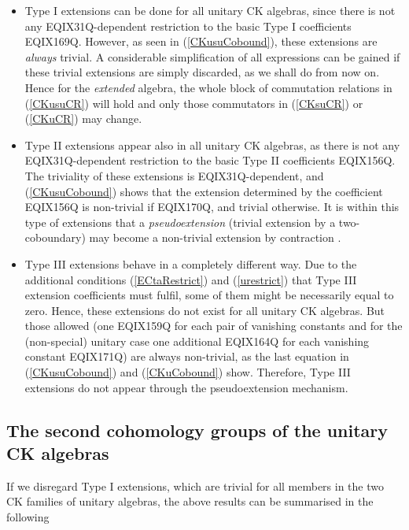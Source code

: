\begin{itemize}
\item
Type I extensions can be done for all  unitary CK
algebras, since there is not any EQIX31Q-dependent
restriction to the basic Type I coefficients
EQIX169Q. However, as seen in
(\ref{CKusuCobound}), these extensions are \emph{always} trivial. A
considerable simplification of all expressions can be gained
if these trivial extensions are simply discarded, as we shall
do from now on. Hence for the \emph{extended}
algebra, the whole block of commutation
relations in (\ref{CKusuCR}) will hold and only those commutators in
(\ref{CKsuCR}) or
(\ref{CKuCR}) may change.

\item
Type II extensions appear also in all  unitary CK
algebras, as there is not any EQIX31Q-dependent restriction to the
basic Type II coefficients
EQIX156Q. The triviality of these extensions is
EQIX31Q-dependent, and (\ref{CKusuCobound}) shows that the extension
determined by the  coefficient EQIX156Q is
non-trivial if EQIX170Q, and trivial otherwise. It is within
this type of extensions that a \emph{pseudoextension} (trivial
extension by a two-coboundary) may become a non-trivial extension
by contraction
\cite{Ald.Azc:85b,Azc.Izq:95}.

\item
Type III extensions behave in a completely different way.
Due to the additional conditions (\ref{ECtaRestrict}) and
(\ref{urestrict}) that Type III extension coefficients must fulfil, some
of them might be necessarily equal to zero. Hence, these extensions do not
exist for all  unitary CK algebras. But those allowed (one
EQIX159Q for each pair of vanishing constants  and for the (non-special)  unitary case one additional EQIX164Q
for each vanishing constant EQIX171Q) are
always non-trivial, as the last equation in (\ref{CKusuCobound}) and
(\ref{CKuCobound}) show. Therefore, Type III extensions  do
not appear through the pseudoextension mechanism.
\end{itemize}

\subsection{The second cohomology groups of the unitary CK algebras}
\label{sec4}

If we disregard Type I extensions, which are trivial for all members in
the two CK families of  unitary algebras, the above  results can be
summarised in the following

